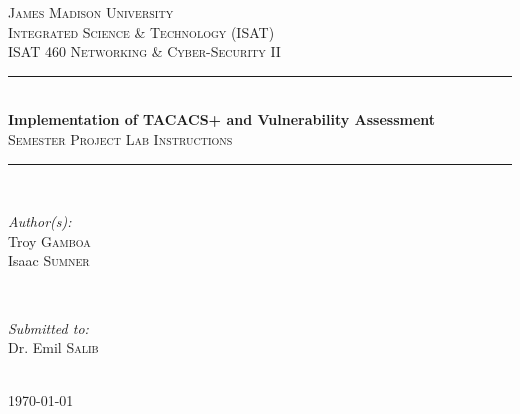 \documentclass[main.tex]{subfiles}
\begin{document}
\begin{titlepage}

\newcommand{\HRule}{\rule{\linewidth}{0.5mm}} %
\center %

\textsc{\LARGE James Madison University}\\[1.0cm] %
\textsc{\Large Integrated Science \& Technology (ISAT)}\\[0.5cm] %
\textsc{\large ISAT 460 Networking \& Cyber-Security II}\\[0.5cm] %

\HRule \\[0.5cm]
{ \Large \bfseries Implementation of TACACS+ and Vulnerability Assessment }\\[0.4cm] %
\textsc{\large Semester Project Lab Instructions}\\[0.4cm]
\HRule \\[.5cm]

\begin{minipage}{0.4\textwidth}
\begin{flushleft} \large
\emph{Author(s):}\\
Troy \textsc{Gamboa}\\ %
Isaac \textsc{Sumner}\\
\end{flushleft}
\end{minipage}
~
\begin{minipage}{0.4\textwidth}
\begin{flushright} \large
\emph{Submitted to:} \\
Dr. Emil \textsc{Salib} %
\end{flushright}
\end{minipage}\\[0.5cm]

{\large \today}\\[0.5cm] %


\end{titlepage}
\end{document}
